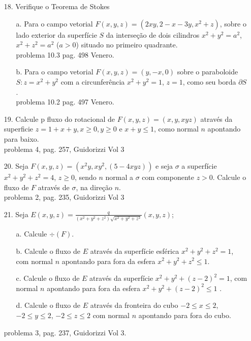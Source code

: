 \begin{itemize}
	\item [18.]  Verifique o Teorema de Stokes 
	\begin{itemize}
	\item[a.] Para o campo vetorial $F(x,y,z)=(2xy,2-x-3y,x^{2}+z)$, sobre o lado exterior da superfície $S$ da interseção de dois cilindros $x^{2}+y^{2}=a^{2}$, $x^{2}+z^{2}=a^{2}$ ($a>0$) situado no primeiro quadrante.\\
	problema 10.3 pag. 498 Venero.
	\item[b.] Para o campo vetorial $F(x,y,z)=(y,-x,0)$ sobre o paraboloide $S: z=x^{2}+y^{2}$ com a circunferência $x^{2}+y^{2}=1$, $z=1$, como seu borda $\partial S$.\\
	problema 10.2 pag. 497 Venero.
   \end{itemize}
\end{itemize}
\begin{itemize}
	\item [19.] Calcule p fluxo do rotacional de $F(x,y,z)=(x,y,xyz)$ através da superficie $z=1+x+y, x\geqslant 0, y\geqslant 0$ e $x+y\leqslant 1$, como normal $n$ apontando para baixo.\\
	problema 4, pag. 257, Guidorizzi Vol 3  
\end{itemize}
\begin{itemize}
	\item [20.] Seja $F(x,y,z)=(x^{2}y,xy^{2},(5-4xyz))$ e seja $\sigma$ a superfície $x^{2}+y^{2}+z^{2}=4$, $z\geqslant 0$, sendo $n$ normal a $\sigma$ com componente $z>0$. Calcule o fluxo de $F$ através de $\sigma$, na direção $n$.\\
	problema 2, pag. 235, Guidorizzi Vol 3  
\end{itemize}
\begin{itemize}
\item [21.] Seja $E(x,y,z)=\frac{q}{(x^{2}+y^{2}+z^{2})\sqrt{x^{2}+y^{2}+z^{2} }} (x,y,z)$; 
\begin{itemize}
	\item[a.] Calcule $\div (F)$.
	\item[b.] Calcule o fluxo de $E$ através da superfície esférica $ x^{2}+y^{2}+z^{2}=1$, com normal $n$ apontando para fora da esfera $x^{2}+y^{2}+z^{2} \leqslant 1$.
	\item[c.] Calcule o fluxo de $E$ através da superfície $x^{2}+y^{2}+(z-2)^{2}=1$,  com normal $n$ apontando para fora da esfera $x^{2}+y^{2}+(z-2)^{2} \leqslant 1$ .
	\item[d.] Calcule o fluxo de $E$ através da fronteira do cubo $-2 \leqslant x\leqslant2$,$-2 \leqslant y\leqslant2$, $-2 \leqslant z\leqslant2$ com normal $n$ apontando para fora do cubo.
\end{itemize}
problema 3, pag. 237, Guidorizzi Vol 3.
\end{itemize}

